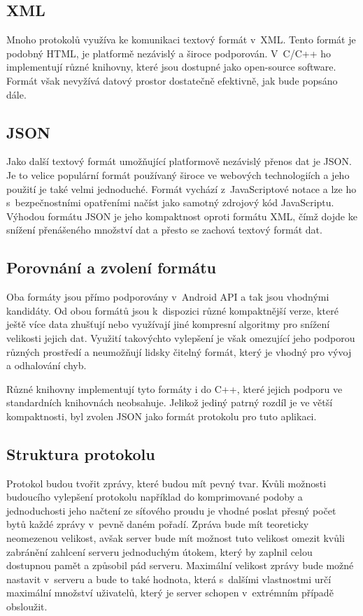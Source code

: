 \documentclass[thesis=B,czech]{FITthesis}[2013/10/20]
\begin{document}
\subsection{XML}

Mnoho protokolů využíva ke komunikaci textový formát v~XML. Tento formát je podobný HTML, je platformě nezávislý a široce podporován. V~C/C++ ho implementují různé knihovny, které jsou dostupné jako open-source software. Formát však nevyžívá datový prostor dostatečně efektivně, jak bude popsáno dále.

\subsection{JSON}

Jako další textový formát umožňující platformově nezávislý přenos dat je JSON. Je to velice populární formát používaný široce ve webových technologiích a jeho použití je také velmi jednoduché. Formát vychází z~JavaScriptové notace a lze ho s~bezpečnostními opatřeními načíst jako samotný zdrojový kód JavaScriptu. Výhodou formátu JSON je jeho kompaktnost oproti formátu XML, čímž dojde ke snížení přenášeného množství dat a přesto se zachová textový formát dat.

\subsection{Porovnání a zvolení formátu}

Oba formáty jsou přímo podporovány v~Android API a tak jsou vhodnými kandidáty. Od obou formátů jsou k~dispozici různé kompaktnější verze, které ještě více data zhušťují nebo využívají jiné kompresní algoritmy pro snížení velikosti jejich dat. Využití takovýchto vylepšení je však omezující jeho podporou různých prostředí a neumožňují lidsky čitelný formát, který je vhodný pro vývoj a odhalování chyb.

Různé knihovny implementují tyto formáty i do C++, které jejich podporu ve standardních knihovnách neobsahuje. Jelikož jediný patrný rozdíl je ve větší kompaktnosti, byl zvolen JSON jako formát protokolu pro tuto aplikaci.

\subsection{Struktura protokolu}

Protokol budou tvořit zprávy, které budou mít pevný tvar. Kvůli možnosti budoucího vylepšení protokolu například do komprimované podoby a jednoduchosti jeho načtení ze síťového proudu je vhodné poslat přesný počet bytů každé zprávy v~pevně daném pořadí. Zpráva bude mít teoreticky neomezenou velikost, avšak server bude mít možnost tuto velikost omezit kvůli zabránění zahlcení serveru jednoduchým útokem, který by zaplnil celou dostupnou pamět a způsobil pád serveru. Maximální velikost zprávy bude možné nastavit v~serveru a bude to také hodnota, která s~dalšími vlastnostmi určí maximální množství uživatelů, který je server schopen v~extrémním případě obsloužit.
\end{document}
